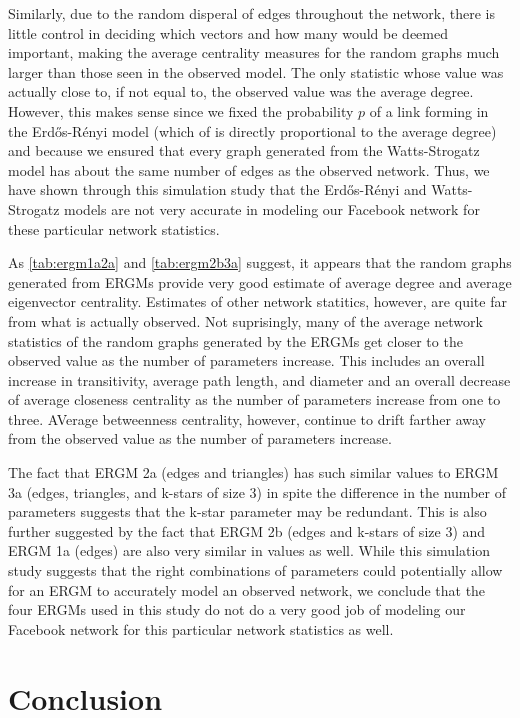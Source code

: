 \documentclass[12pt,twoside]{amherstthesis}
\begin{document}
  Similarly, due to the random disperal of edges throughout the network,
  there is little control in deciding which vectors and how many would be
  deemed important, making the average centrality measures for the random
  graphs much larger than those seen in the observed model. The only
  statistic whose value was actually close to, if not equal to, the
  observed value was the average degree. However, this makes sense since
  we fixed the probability \(p\) of a link forming in the Erdős-Rényi
  model (which of is directly proportional to the average degree) and
  because we ensured that every graph generated from the Watts-Strogatz
  model has about the same number of edges as the observed network. Thus,
  we have shown through this simulation study that the Erdős-Rényi and
  Watts-Strogatz models are not very accurate in modeling our Facebook
  network for these particular network statistics.
  
  As \autoref{tab:ergm1a2a} and \autoref{tab:ergm2b3a} suggest, it appears
  that the random graphs generated from ERGMs provide very good estimate
  of average degree and average eigenvector centrality. Estimates of other
  network statitics, however, are quite far from what is actually
  observed. Not suprisingly, many of the average network statistics of the
  random graphs generated by the ERGMs get closer to the observed value as
  the number of parameters increase. This includes an overall increase in
  transitivity, average path length, and diameter and an overall decrease
  of average closeness centrality as the number of parameters increase
  from one to three. AVerage betweenness centrality, however, continue to
  drift farther away from the observed value as the number of parameters
  increase.
  
  The fact that ERGM 2a (edges and triangles) has such similar values to
  ERGM 3a (edges, triangles, and k-stars of size \(3\)) in spite the
  difference in the number of parameters suggests that the k-star
  parameter may be redundant. This is also further suggested by the fact
  that ERGM 2b (edges and k-stars of size \(3\)) and ERGM 1a (edges) are
  also very similar in values as well. While this simulation study
  suggests that the right combinations of parameters could potentially
  allow for an ERGM to accurately model an observed network, we conclude
  that the four ERGMs used in this study do not do a very good job of
  modeling our Facebook network for this particular network statistics as
  well.
  
  \chapter*{Conclusion}\label{conclusion}
  
\end{document}
